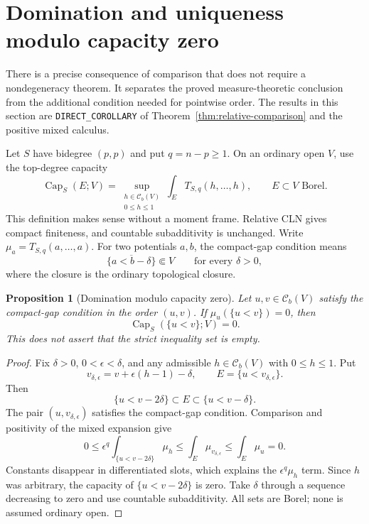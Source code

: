 \documentclass[11pt,a4paper]{article}
\numberwithin{equation}{section}
\newtheorem{proposition}[theorem]{Proposition}
\theoremstyle{definition}
\theoremstyle{remark}
\newcommand{\Cb}{\mathcal C_b}
\begin{document}
\section{Domination and uniqueness modulo capacity zero}
\label{sec:capacity-domination}

There is a precise consequence of comparison that does not require a
nondegeneracy theorem. It separates the proved measure-theoretic
conclusion from the additional condition needed for pointwise order.
The results in this section are \texttt{DIRECT\_COROLLARY} of
Theorem~\ref{thm:relative-comparison} and the positive mixed calculus.

Let $S$ have bidegree $(p,p)$ and put $q=n-p\geq1$. On an ordinary
open $V$, use the top-degree capacity
\[
 \operatorname{Cap}_S(E;V)
   =\sup_{\substack{h\in\Cb(V)\\0\leq h\leq1}}
       \int_E T_{S,q}(h,\ldots,h),
       \qquad E\subset V\text{ Borel}.
\]
This definition makes sense without a moment frame. Relative CLN gives
compact finiteness, and countable subadditivity is unchanged. Write
$\mu_a=T_{S,q}(a,\ldots,a)$. For two potentials $a,b$, the compact-gap
condition means
\[
 \overline{\{a<b-\delta\}}\Subset V
             \qquad\text{for every }\delta>0,
\]
where the closure is the ordinary topological closure.

\begin{proposition}[Domination modulo capacity zero]
\label{prop:capacity-domination}
Let $u,v\in\Cb(V)$ satisfy the compact-gap condition in the order
$(u,v)$. If $\mu_u(\{u<v\})=0$, then
\[
 \operatorname{Cap}_S(\{u<v\};V)=0.
\]
This does not assert that the strict inequality set is empty.
\end{proposition}

\begin{proof}
Fix $\delta>0$, $0<\epsilon<\delta$, and any admissible
$h\in\Cb(V)$ with $0\leq h\leq1$. Put
\[
 v_{\delta,\epsilon}=v+\epsilon(h-1)-\delta,
 \qquad E=\{u<v_{\delta,\epsilon}\}.
\]
Then
\[
 \{u<v-2\delta\}\subset E\subset\{u<v-\delta\}.
\]
The pair $(u,v_{\delta,\epsilon})$ satisfies the compact-gap condition.
Comparison and positivity of the mixed expansion give
\[
 0\leq\epsilon^q\int_{\{u<v-2\delta\}}\mu_h
 \leq\int_E\mu_{v_{\delta,\epsilon}}
 \leq\int_E\mu_u=0.
\]
Constants disappear in differentiated slots, which explains the
$\epsilon^q\mu_h$ term. Since $h$ was arbitrary, the capacity of
$\{u<v-2\delta\}$ is zero. Take $\delta$ through a sequence
decreasing to zero and use countable subadditivity. All sets are Borel;
none is assumed ordinary open.
\end{proof}
\end{document}
